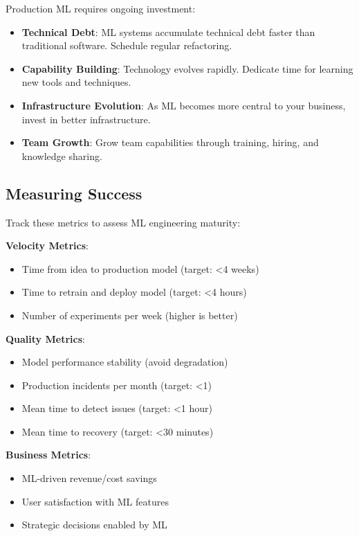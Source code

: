 Production ML requires ongoing investment:

\begin{itemize}
    \item \textbf{Technical Debt}: ML systems accumulate technical debt faster than traditional software. Schedule regular refactoring.
    \item \textbf{Capability Building}: Technology evolves rapidly. Dedicate time for learning new tools and techniques.
    \item \textbf{Infrastructure Evolution}: As ML becomes more central to your business, invest in better infrastructure.
    \item \textbf{Team Growth}: Grow team capabilities through training, hiring, and knowledge sharing.
\end{itemize}

\subsection{Measuring Success}

Track these metrics to assess ML engineering maturity:

\textbf{Velocity Metrics}:
\begin{itemize}
    \item Time from idea to production model (target: <4 weeks)
    \item Time to retrain and deploy model (target: <4 hours)
    \item Number of experiments per week (higher is better)
\end{itemize}

\textbf{Quality Metrics}:
\begin{itemize}
    \item Model performance stability (avoid degradation)
    \item Production incidents per month (target: <1)
    \item Mean time to detect issues (target: <1 hour)
    \item Mean time to recovery (target: <30 minutes)
\end{itemize}

\textbf{Business Metrics}:
\begin{itemize}
    \item ML-driven revenue/cost savings
    \item User satisfaction with ML features
    \item Strategic decisions enabled by ML
\end{itemize}

